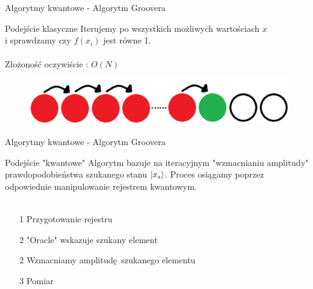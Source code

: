 \documentclass{beamer}
\DeclarePairedDelimiter\ket{\lvert}{\rangle}
\begin{document}
		\begin{frame}{Algorytmy kwantowe - Algorytm Groovera}
		\begin{block}{Podejście klasyczne}
			\vspace{0.5em}
			Iterujemy po wszystkich możliwych wartościach $x$ \\i sprawdzamy czy $f(x_{i})$ jest równe 1.\\~\\
			Złożoność oczywiście : $O(N)$
			\vspace{0.5em}
		\end{block}
		\vspace{0.5em}
		\begin{center}
			\begin{figure}
				\includegraphics[scale=0.25]{media/classicSearch.png}
			\end{figure}
		\end{center}
	\end{frame}

	\begin{frame}{Algorytmy kwantowe - Algorytm Groovera}
		\begin{block}{Podejście "kwantowe"}
			\vspace{0.5em}
			Algorytm bazuje na iteracyjnym "wzmacnianiu amplitudy" prawdopodobieństwa szukanego stanu $\ket{x_s}$.
			Proces osiągamy poprzez odpowiednie manipulowanie rejestrem kwantowym.\\~\\
			
			\begin{enumerate}
				
				\item[1] Przygotowanie rejestru
				\item[2] "Oracle" wskazuje szukany element
				\item[2] Wzmacniamy amplitudę szukanego elementu
				\item[3] Pomiar
								
			\end{enumerate}
			\vspace{0.5em}
		\end{block}
	\end{frame}
\end{document}
